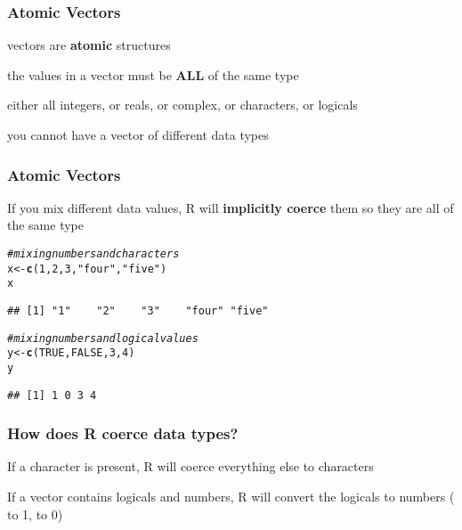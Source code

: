 \documentclass[12pt]{beamer}\usepackage[]{graphicx}\usepackage[]{color}
\makeatletter
\newcommand{\hlnum}[1]{\textcolor[rgb]{0.686,0.059,0.569}{#1}}%
\newcommand{\hlstr}[1]{\textcolor[rgb]{0.192,0.494,0.8}{#1}}%
\newcommand{\hlcom}[1]{\textcolor[rgb]{0.678,0.584,0.686}{\textit{#1}}}%
\newcommand{\hlstd}[1]{\textcolor[rgb]{0.345,0.345,0.345}{#1}}%
\newcommand{\hlkwb}[1]{\textcolor[rgb]{0.69,0.353,0.396}{#1}}%
\newcommand{\hlkwd}[1]{\textcolor[rgb]{0.737,0.353,0.396}{\textbf{#1}}}%
\newenvironment{kframe}{%
 \def\at@end@of@kframe{}%
 \ifinner\ifhmode%
  \def\at@end@of@kframe{\end{minipage}}%
  \begin{minipage}{\columnwidth}%
 \fi\fi%
 \def\FrameCommand##1{\hskip\@totalleftmargin \hskip-\fboxsep
 \colorbox{shadecolor}{##1}\hskip-\fboxsep
     \hskip-\linewidth \hskip-\@totalleftmargin \hskip\columnwidth}%
 \MakeFramed {\advance\hsize-\width
   \@totalleftmargin\z@ \linewidth\hsize
   \@setminipage}}%
 {\par\unskip\endMakeFramed%
 \at@end@of@kframe}
\newenvironment{knitrout}{}{} %
\makeatother
\begin{document}
\begin{frame}
\frametitle{Atomic Vectors}

\bbi
  \item vectors are \textbf{atomic} structures
  \item the values in a vector must be \textbf{ALL} of the same type 
  \item either all integers, or reals, or complex, or characters, or logicals
  \item you cannot have a vector of different data types
\ei

\end{frame}


\begin{frame}[fragile]
\frametitle{Atomic Vectors}

If you mix different data values, R will \textbf{implicitly coerce} them 
so they are all of the same type
\begin{knitrout}\footnotesize
{}\color{fgcolor}\begin{kframe}
\begin{alltt}
\hlcom{# mixing numbers and characters}
\hlstd{x} \hlkwb{<-} \hlkwd{c}\hlstd{(}\hlnum{1}\hlstd{,} \hlnum{2}\hlstd{,} \hlnum{3}\hlstd{,} \hlstr{"four"}\hlstd{,} \hlstr{"five"}\hlstd{)}
\hlstd{x}
\end{alltt}
\begin{verbatim}
## [1] "1"    "2"    "3"    "four" "five"
\end{verbatim}
\begin{alltt}
\hlcom{# mixing numbers and logical values}
\hlstd{y} \hlkwb{<-} \hlkwd{c}\hlstd{(}\hlnum{TRUE}\hlstd{,} \hlnum{FALSE}\hlstd{,} \hlnum{3}\hlstd{,} \hlnum{4}\hlstd{)}
\hlstd{y}
\end{alltt}
\begin{verbatim}
## [1] 1 0 3 4
\end{verbatim}
\end{kframe}
\end{knitrout}

\end{frame}


\begin{frame}
\frametitle{How does R coerce data types?}

If a character is present, R will coerce everything else to characters

\pause
\bigskip

If a vector contains logicals and numbers, R will convert the logicals to 
numbers ( to 1,  to 0)
\eb

\end{frame}
\end{document}
